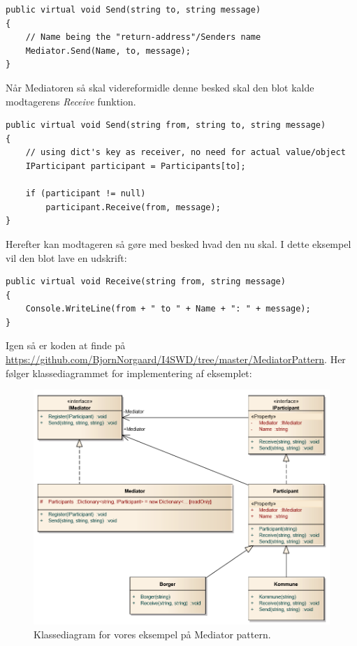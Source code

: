 \begin{lstlisting}
public virtual void Send(string to, string message)
{
	// Name being the "return-address"/Senders name
	Mediator.Send(Name, to, message);
}
\end{lstlisting}

Når Mediatoren så skal videreformidle denne besked skal den blot kalde modtagerens \textit{Receive} funktion.

\begin{lstlisting}
public virtual void Send(string from, string to, string message)
{
	// using dict's key as receiver, no need for actual value/object
	IParticipant participant = Participants[to];
	
	if (participant != null)
		participant.Receive(from, message);
}
\end{lstlisting}

Herefter kan modtageren så gøre med besked hvad den nu skal. I dette eksempel vil den blot lave en udskrift:

\begin{lstlisting}
public virtual void Receive(string from, string message)
{
	Console.WriteLine(from + " to " + Name + ": " + message);
}
\end{lstlisting}

Igen så er koden at finde på \url{https://github.com/BjornNorgaard/I4SWD/tree/master/MediatorPattern}. Her følger klassediagrammet for implementering af eksemplet:

\begin{figure}[h]
	\centering
	\includegraphics[width=\linewidth]{figs/classdiagram}
	\caption{Klassediagram for vores eksempel på Mediator pattern.}
	\label{fig:mediclass}
\end{figure}